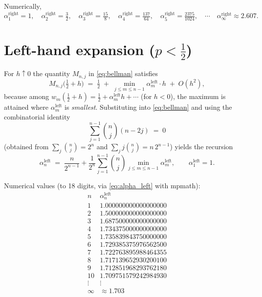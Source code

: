 \documentclass{article}
\theoremstyle{remark}
\begin{document}
Numerically,
\[
  \alpha_{1}^{\text{right}}=1,\quad
  \alpha_{2}^{\text{right}}=\tfrac{3}{2},\quad
  \alpha_{3}^{\text{right}}=\tfrac{15}{8},\quad
  \alpha_{4}^{\text{right}}=\tfrac{137}{64},\quad
  \alpha_{5}^{\text{right}}=\tfrac{2375}{1024},\quad\cdots\quad
  \alpha_{\infty}^{\text{right}}\approx 2.607.
\]

\section{Left-hand expansion ($p<\tfrac12$)}

For $h\uparrow 0$ the quantity $M_{n,j}$ in \eqref{eq:bellman} satisfies
\[
  M_{n,j}\bigl(\tfrac12+h\bigr)
  \;=\;\tfrac12\;+\;\min_{j\le m\le n-1}\alpha_{m}^{\text{left}}\cdot h\;+\;O(h^{2}),
\]
because among $w_{m}(\tfrac12+h)=\tfrac12+\alpha_{m}^{\text{left}}h+\cdots$ (for $h<0$),
the maximum is attained where $\alpha_{m}^{\text{left}}$ is
\emph{smallest}. Substituting into \eqref{eq:bellman} and using the
combinatorial identity
\[
  \sum_{j=1}^{n-1}\binom{n}{j}(n-2j)\;=\;0
\]
(obtained from $\sum_j\binom{n}{j}=2^{n}$ and
$\sum_j j\binom{n}{j}=n\,2^{n-1}$) yields the recursion
\begin{equation}\label{eq:alpha_left}
  \boxed{\;\alpha_{n}^{\text{left}}
  \;=\;\frac{n}{2^{n-1}}
  +\frac{1}{2^{n}}\sum_{j=1}^{n-1}\binom{n}{j}
  \min_{j\le m\le n-1}\alpha_{m}^{\text{left}},\qquad\alpha_{1}^{\text{left}}=1.\;}
\end{equation}

Numerical values (to 18 digits, via \eqref{eq:alpha_left} with mpmath):
\[
\begin{array}{c|l}
  n & \alpha_{n}^{\text{left}}\\\hline
  1 & 1.000000000000000000\\
  2 & 1.500000000000000000\\
  3 & 1.687500000000000000\\
  4 & 1.734375000000000000\\
  5 & 1.735839843750000000\\
  6 & 1.729385375976562500\\
  7 & 1.722763895988464355\\
  8 & 1.717139652930200100\\
  9 & 1.712851968293762180\\
  10& 1.709751579242984930\\
  \vdots & \vdots\\
  \infty & \approx 1.703
\end{array}
\]
\end{document}
